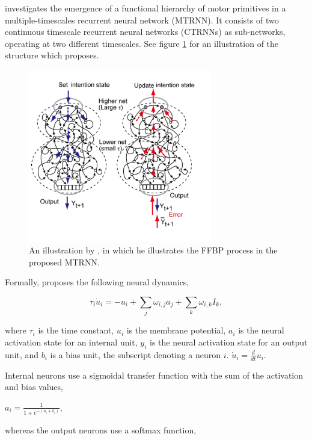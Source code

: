 \cite{Tani2014} investigates the emergence of a functional hierarchy of motor primitives in a multiple-timescales recurrent neural network (MTRNN). It consists of two continuous timescale recurrent neural networks (CTRNNs) as sub-networks, operating at two different timescales. See figure \ref{fig:tani_2014_mtrnn} for an illustration of the structure which \cite{Tani2014} proposes.

\begin{figure}
\centering
\includegraphics[width=8cm]{fig/tani_2014_mtrnn}
\caption{An illustration by \cite{Tani2014}, in which he illustrates the FFBP process in the proposed MTRNN.}
\label{fig:tani_2014_mtrnn}
\end{figure}

Formally, \cite{Tani2014} proposes the following neural dynamics,

\begin{equation}\label{tani_membrane_potential}
    \tau_i\dot{u}_i = -u_i + \sum_{j}{}\omega_{i,j}a_j + \sum_{k}{}\omega_{i,k} I_k,
\end{equation}

where $\tau_i$ is the time constant, $u_i$ is the membrane potential, $a_i$ is the neural activation state for an internal unit, $y_i$ is the neural activation state for an output unit, and $b_i$ is a bias unit, the subscript denoting a neuron $i$. $\dot{u}_i = \frac{d}{d t}u_i$.

Internal neurons use a sigmoidal transfer function with the sum of the activation and bias values, 

\begin{center}\begin{math}
    a_i = \frac{1}{1+e^{-(u_i+b_i)}},
\end{math}\end{center}
whereas the output neurons use a softmax function,

